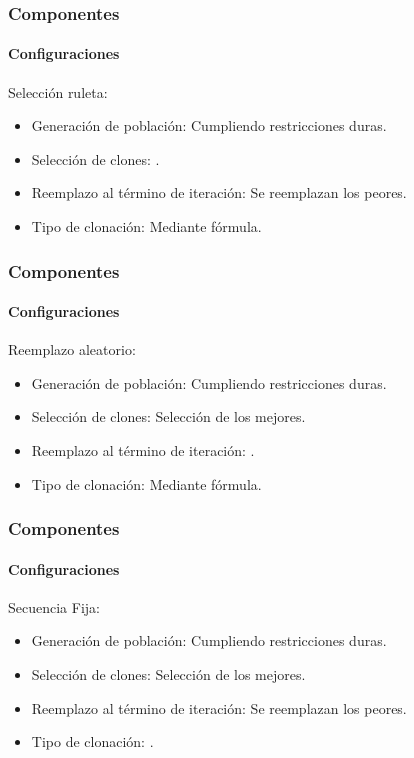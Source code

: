 \frame
{
\frametitle{Componentes}
\framesubtitle{Configuraciones}
Selección ruleta:

        \begin{itemize}
            \item Generación de población: Cumpliendo restricciones duras.
            \item Selección de clones: .
            \item Reemplazo al término de iteración:  Se reemplazan los peores.
            \item Tipo de clonación: Mediante fórmula.
        \end{itemize}
}
\frame
{
\frametitle{Componentes}
\framesubtitle{Configuraciones}
Reemplazo aleatorio:

        \begin{itemize}
            \item Generación de población: Cumpliendo restricciones duras.
            \item Selección de clones: Selección de los mejores.
            \item Reemplazo al término de iteración:  .
            \item Tipo de clonación: Mediante fórmula.
        \end{itemize}
}
\frame
{
\frametitle{Componentes}
\framesubtitle{Configuraciones}
Secuencia Fija:

        \begin{itemize}
            \item Generación de población: Cumpliendo restricciones duras.
            \item Selección de clones: Selección de los mejores.
            \item Reemplazo al término de iteración:  Se reemplazan los peores.
            \item Tipo de clonación: .
        \end{itemize}

}

